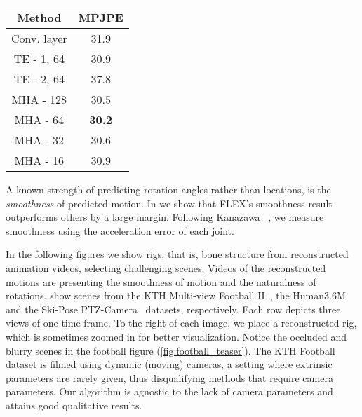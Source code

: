 \begin{table}[t!]
\begin{minipage}{.36\linewidth}
\begin{center}
\begin{tabular}{|c|c|}
\textbf{Method} & \textbf{MPJPE} \\

\hline
Conv. layer & 31.9 \\
\hline
TE - 1, 64 & 30.9 \\
\hline
TE - 2, 64 & 37.8 \\
\hline
MHA - 128 & 30.5 \\
\hline
MHA - 64 & \textbf{30.2} \\
\hline
MHA - 32 & 30.6 \\
\hline
MHA - 16 & 30.9 \\
\hline

\end{tabular}
\end{center}
         \label{tab:fusion_arch}
    \end{minipage}
    \hfill
    \hphantom{.} 

\setlength{\abovecaptionskip}{-35pt plus 3pt minus 2pt}
\setlength{\belowcaptionskip}{-0pt plus 3pt minus 2pt}
\caption*{}

\end{table} 
A known strength of predicting rotation angles rather than locations, is the \emph{smoothness} of predicted motion. 
In  we show that FLEX's smoothness result outperforms others by a large margin. Following Kanazawa \etal~\cite{kanazawa2019learning}, we measure smoothness using the acceleration error of each joint. 





In the following figures we show rigs, that is, bone structure 
from reconstructed animation videos, selecting challenging scenes. Videos of the reconstructed motions are  
\fi
presenting the smoothness of motion and the naturalness of rotations. 
 show scenes from the KTH Multi-view Football II~\cite{footballDS}, the Human3.6M~\cite{h36m_pami,IonescuSminchisescu11} and the Ski-Pose PTZ-Camera~\cite{ski_ptz} datasets, respectively. 
Each row depicts three views of one time frame. To the right of each image, we place a reconstructed rig, which is sometimes zoomed in for better visualization. 
Notice the occluded and blurry scenes in the football figure (\ref{fig:football_teaser}). The KTH Football dataset is filmed using dynamic (moving) cameras, 
a setting where extrinsic parameters are rarely given, thus disqualifying methods that require camera parameters.
Our algorithm is agnostic to the lack of camera parameters and attains good qualitative results. 

